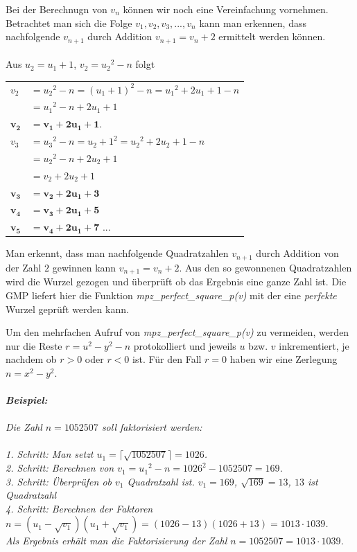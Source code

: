 \documentclass[10pt, bigheadings]{scrartcl}
\begin{document}
Bei der Berechnugn von $v_n$ können wir noch eine Vereinfachung vornehmen.
Betrachtet man sich die Folge $v_1, v_2 , v_3 , ..., v_n$ kann man erkennen,
dass nachfolgende $v_{n+1}$ durch Addition $v_{n+1} = v_n+2$ ermittelt werden können.\\\\
Aus $u_2 = u_1 + 1$, $v_2 = {u_2}^2 - n$ folgt\\
\begin{center}
\begin{tabular}{ll}
$v_2$ & $= {u_2}^2 - n = (u_1 + 1)^2 - n = {u_1}^2 + 2u_1 + 1 - n$\\
      &	$= {u_1}^2 - n + 2u_1 +1$\\
$\mathbf{v_2}$ & $\mathbf{= v_1 + 2u_1 + 1}$.\\

$v_3$ & $= {u_3}^2 - n = {u_2 +1}^2 = {u_2}^2 + 2u_2 + 1 - n$\\
	& $= {u_2}^2 - n + 2u_2 + 1$\\
	& $= v_2 + 2u_2 +1$\\
$\mathbf{v_3}$	& $\mathbf{= v_2 + 2u_1 +3}$\\
 $\mathbf{v_4}$	& $\mathbf{ = v_3 + 2u_1 + 5}$\\
 $\mathbf{v_5}$	& $\mathbf{ = v_4 + 2u_1 + 7}$ ...\\
\end{tabular}
\end{center}

Man erkennt, dass man nachfolgende Quadratzahlen $v_{n+1}$ durch Addition
von der Zahl $2$ gewinnen kann $v_{n+1} = v_n + 2$. Aus den so gewonnenen Quadratzahlen
wird die Wurzel gezogen und überprüft ob das Ergebnis eine ganze Zahl ist.
Die GMP liefert hier die Funktion \textit{mpz\_perfect\_square\_p(v)} mit der
eine \textit{perfekte} Wurzel geprüft werden kann.

Um den mehrfachen Aufruf von \textit{mpz\_perfect\_square\_p(v)} zu vermeiden,
werden nur die Reste $r = u^2 - y^2 - n$ protokolliert und jeweils $u$ bzw.
$v$ inkrementiert, je nachdem ob $r>0$ oder $r<0$ ist. Für den Fall $r = 0$
haben wir eine Zerlegung $n = x^2 - y^2$.\\\\
{\it
\textbf{Beispiel:}\\\\
Die Zahl $n = 1052507$ soll faktorisiert werden:\\\\
1. Schritt: Man setzt $u_1 = \lceil\sqrt{1052507}\rceil = 1026$.\\
2. Schritt: Berechnen von  $v_1 = {u_1}^2 - n = 1026^2 - 1052507 = 169$.\\
3. Schritt: Überprüfen ob $v_1$ Quadratzahl ist.
	$v_1 = 169$, $\sqrt{169} = 13$, $13$ ist Quadratzahl \\
4. Schritt: Berechnen der Faktoren
$n = (u_1 - \sqrt{v_1})(u_1 + \sqrt{v_1}) = (1026 - 13)(1026 + 13) = 1013\cdot1039$.\\
Als Ergebnis erhält man die Faktorisierung der Zahl $n=1052507=1013\cdot1039$.\\\\
}
\end{document}
